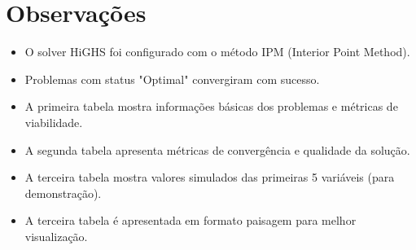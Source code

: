 \documentclass[12pt]{article}
\begin{document}
\section{Observações}

\begin{itemize}
\item O solver HiGHS foi configurado com o método IPM (Interior Point Method).
\item Problemas com status "Optimal" convergiram com sucesso.
\item A primeira tabela mostra informações básicas dos problemas e métricas de viabilidade.
\item A segunda tabela apresenta métricas de convergência e qualidade da solução.
\item A terceira tabela mostra valores simulados das primeiras 5 variáveis (para demonstração).
\item A terceira tabela é apresentada em formato paisagem para melhor visualização.
\end{itemize}
\end{document}
